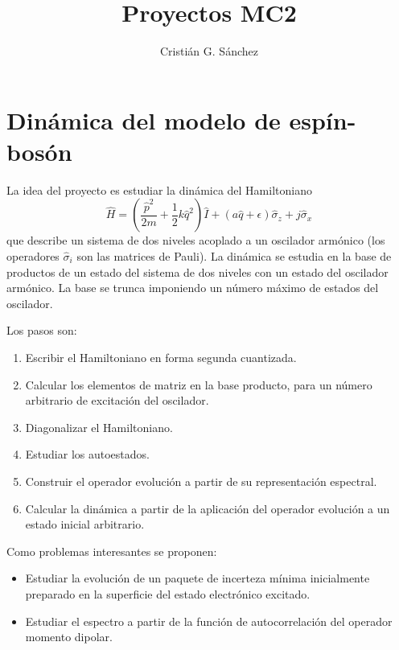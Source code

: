 \documentclass[12pt,a4paper]{article}
\begin{document}
\title{Proyectos MC2}
\author{Cristián G. Sánchez}
	
\maketitle
	
	\section{Dinámica del modelo de espín-bosón}
	La idea del proyecto es estudiar la dinámica del Hamiltoniano
\[\hat{H}=\left(\frac{\hat{p}^2}{2m}+\frac{1}{2}k\hat{q}^2\right)\hat{I}+(a\hat{q}+\epsilon)\hat{\sigma}_z+j\hat{\sigma}_x\]
	que describe un sistema de dos niveles acoplado a un oscilador armónico (los operadores $\hat{\sigma}_i$ son las matrices de Pauli). La dinámica se estudia en la base de productos de un estado del sistema de dos niveles con un estado del oscilador armónico. La base se trunca imponiendo un número máximo de estados del oscilador.

	Los pasos son:
\begin{enumerate}
	\item Escribir el Hamiltoniano en forma segunda cuantizada.
	\item Calcular los elementos de matriz en la base producto, para un número arbitrario de excitación del oscilador.
	\item Diagonalizar el Hamiltoniano.
	\item Estudiar los autoestados.
	\item Construir el operador evolución a partir de su representación espectral.
	\item Calcular la dinámica a partir de la aplicación del operador evolución a un estado inicial arbitrario.
\end{enumerate}
	Como problemas interesantes se proponen:
	\begin{itemize}
		\item Estudiar la evolución de un paquete de incerteza mínima inicialmente preparado en la superficie del estado electrónico excitado.
		\item Estudiar el espectro a partir de la función de autocorrelación del operador momento dipolar.
	\end{itemize}
\end{document}
